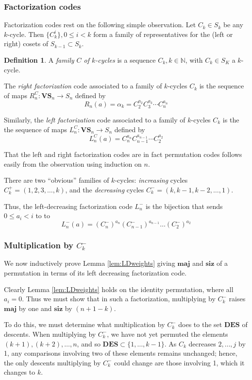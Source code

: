 \documentclass{amsart}[12pt]
\theoremstyle{definition}
\newtheorem{definition}[dummy]{Definition}
\newcommand{\N}{\mathbb{N}}
\newcommand{\DES}{\mathbf{DES}}
\newcommand{\maj}{\mathbf{maj}}
\newcommand{\siz}{\mathbf{siz}}
\newcommand{\VS}{\mathbf{VS}}
\begin{document}
\subsubsection{Factorization codes} \label{sec:factorization}

Factorization codes rest on the following simple observation.  Let $C_k\in S_k$ be any $k$-cycle.  Then $\{C_k^i\}, 0\leq i < k$ form a family of representatives for the (left or right) cosets of $S_{k-1}\subset S_k$.   

\begin{definition}
A \emph{family $C$ of $k$-cycles} is a sequence $C_k, k\in \N$, with $C_k\in S_K$ a $k$-cycle.

The \emph{right factorization} code associated to a family of $k$-cycles $C_k$ is the sequence of maps $R^C_n:\VS_n\to S_n$ defined by
$$R_n(a)=\alpha_k=C_2^{a_2}C_3^{a_3}\cdots C_n^{a_n}$$

Similarly, the \emph{left factorization} code associated to a family of $k$-cycles $C_k$ is the the sequence of maps $L^C_n:\VS_n\to S_n$ defined by
$$L^C_n(a)=C_n^{a_n}C_{n-1}^{a_{n-1}}\cdots C_2^{a_2}$$
\end{definition}

That the left and right factorization codes are in fact permutation codes follows easily from the observation using induction on $n$.

There are two ``obvious'' families of $k$-cycles:  \emph{increasing} cycles $C^+_k=(1,2,3,\dots,k)$, and the \emph{decreasing} cycles $C^-_k=(k,k-1,k-2,\dots,1)$.  

Thus, the left-decreasing factorization code $L^-_n$ is the bijection that sends $0\leq a_i<i$ to to 
$$L^-_n(a)=(C_n^-)^{a_n}(C_{n-1}^-)^{a_{n-1}}\dots (C_2^-)^{a_2}$$


\subsubsection{Multiplication by $C_k^-$} \label{sec:factorizationinductuction}

We now inductively prove Lemma \ref{lem:LDweights} giving $\maj$ and $\siz$ of a permutation in terms of its left decreasing factorization code.

Clearly Lemma \ref{lem:LDweights} holds on the identity permutation, where all $a_i=0$.   Thus we must show that in such a factorization, multiplying by $C^-_k$ raises $\maj$ by one and $\siz$ by $(n+1-k)$.

To do this, we must determine what multiplication by $C_k^-$ does to the set $\DES$ of descents.  When multiplying by $C^-_k$, we have not yet permuted the elements $(k+1), (k+2),\dots, n$, and so $\DES\subset \{1,\dots, k-1\}$. As $C_k$ decreases $2,\dots, j$ by 1, any comparisons involving two of these elements remains unchanged; hence, the only descents multiplying by $C^-_k$ could change are those involving 1, which it changes to $k$.
\end{document}
